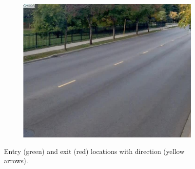\begin{figure}
\begin{subfigure}{0.32\linewidth}
            \includegraphics[width=\linewidth]{./img/scene_learning/res/ILCHI_CHI003/ILCHI_CHI003_20151010_075033_051-2.jpg}
        \end{subfigure}
        \caption{Entry (green) and exit (red) locations with direction (yellow arrows).}
        \label{fig:entry-exit-app-7}
\end{figure}
